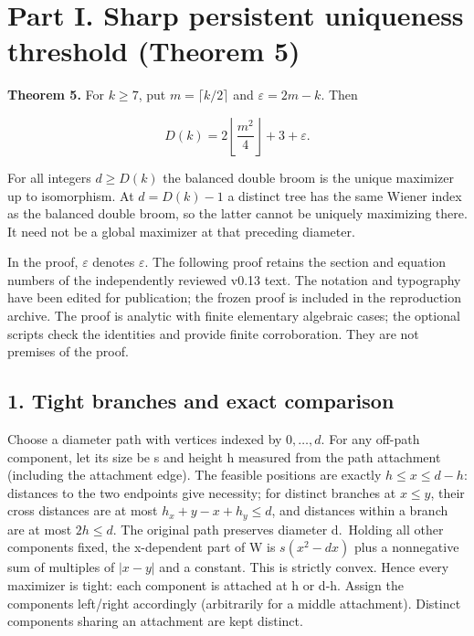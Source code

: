 \documentclass[
  10pt,
  a4paper,
]{article}
\begin{document}
\section{Part I. Sharp persistent uniqueness threshold (Theorem
5)}\label{part-i.-sharp-persistent-uniqueness-threshold-theorem-5}

\textbf{Theorem 5.} For \(k\ge7\), put \(m=\lceil k/2\rceil\) and
\(\varepsilon=2m-k\). Then

\[\boxed{D(k)=2\left\lfloor\frac{m^2}{4}\right\rfloor+3+\varepsilon.}\]

For all integers \(d\ge D(k)\) the balanced double broom is the unique
maximizer up to isomorphism. At \(d=D(k)-1\) a distinct tree has the
same Wiener index as the balanced double broom, so the latter cannot be
uniquely maximizing there. It need not be a global maximizer at that
preceding diameter.

In the proof, \(\varepsilon\) denotes \(\varepsilon\). The following
proof retains the section and equation numbers of the independently
reviewed v0.13 text. The notation and typography have been edited for
publication; the frozen proof is included in the reproduction archive.
The proof is analytic with finite elementary algebraic cases; the
optional scripts check the identities and provide finite corroboration.
They are not premises of the proof.

\subsection{1. Tight branches and exact
comparison}\label{tight-branches-and-exact-comparison}

Choose a diameter path with vertices indexed by \(0,\ldots,d\). For any
off-path component, let its size be s and height h measured from the
path attachment (including the attachment edge). The feasible positions
are exactly \(h\le x\le d-h\): distances to the two endpoints give
necessity; for distinct branches at \(x\le y\), their cross distances
are at most \(h_x+y-x+h_y\le d\), and distances within a branch are at
most \(2h\le d\). The original path preserves diameter d.~Holding all
other components fixed, the x-dependent part of W is \(s(x^2-dx)\) plus
a nonnegative sum of multiples of \(|x-y|\) and a constant. This is
strictly convex. Hence every maximizer is tight: each component is
attached at h or d-h. Assign the components left/right accordingly
(arbitrarily for a middle attachment). Distinct components sharing an
attachment are kept distinct.
\end{document}
